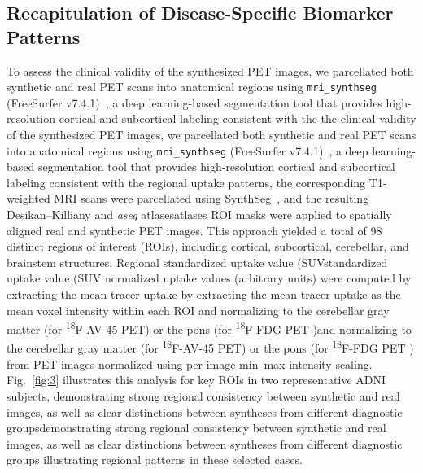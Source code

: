 \documentclass{article}
\providecommand{\DIFaddtex}[1]{{\protect\color{blue} \sf #1}} %
\providecommand{\DIFdeltex}[1]{{\protect\color{red} \ifmmode #1\else\scriptsize #1\fi}} %
\providecommand{\DIFaddbegin}{} %
\providecommand{\DIFaddend}{} %
\providecommand{\DIFdelbegin}{} %
\providecommand{\DIFdelend}{} %
\providecommand{\DIFadd}[1]{\texorpdfstring{\DIFaddtex{#1}}{#1}} %
\providecommand{\DIFdel}[1]{\texorpdfstring{\DIFdeltex{#1}}{}} %
\newcommand{\DIFscaledelfig}{0.5}
\newlength{\DIFdelgraphicswidth} %
\newlength{\DIFdelgraphicsheight} %
\newcommand{\DIFaddincludegraphics}[2][]{{\color{blue}\fbox{\DIFOincludegraphics[#1]{#2}}}} %
\newcommand{\DIFdelincludegraphics}[2][]{%
\sbox{\DIFdelgraphicsbox}{\DIFOincludegraphics[#1]{#2}}%
\settoboxwidth{\DIFdelgraphicswidth}{\DIFdelgraphicsbox} %
\settoboxtotalheight{\DIFdelgraphicsheight}{\DIFdelgraphicsbox} %
\scalebox{\DIFscaledelfig}{%
\parbox[b]{\DIFdelgraphicswidth}{\usebox{\DIFdelgraphicsbox}\\[-\baselineskip] \rule{\DIFdelgraphicswidth}{0em}}\llap{\resizebox{\DIFdelgraphicswidth}{\DIFdelgraphicsheight}{%
\setlength{\unitlength}{\DIFdelgraphicswidth}%
\begin{picture}(1,1)%
\thicklines\linethickness{2pt} %
{\color[rgb]{1,0,0}\put(0,0){\framebox(1,1){}}}%
{\color[rgb]{1,0,0}\put(0,0){\line( 1,1){1}}}%
{\color[rgb]{1,0,0}\put(0,1){\line(1,-1){1}}}%
\end{picture}%
}\hspace*{3pt}}} %
} %
\DeclareRobustCommand{\DIFaddbegin}{\DIFOaddbegin \let\includegraphics\DIFaddincludegraphics} %
\DeclareRobustCommand{\DIFaddend}{\DIFOaddend \let\includegraphics\DIFOincludegraphics} %
\DeclareRobustCommand{\DIFdelbegin}{\DIFOdelbegin \let\includegraphics\DIFdelincludegraphics} %
\DeclareRobustCommand{\DIFdelend}{\DIFOaddend \let\includegraphics\DIFOincludegraphics} %
\begin{document}


\DIFaddend \subsection{Recapitulation of Disease-Specific Biomarker Patterns}
To assess \DIFdelbegin \DIFdel{the clinical validity of the synthesized PET images, we parcellated both synthetic and real PET scans into anatomical regions using \texttt{mri\_synthseg} (FreeSurfer v7.4.1)~\cite{fischl2012freesurfer,dalca2022synthseg}, a deep learning-based segmentation tool that provides high-resolution cortical and subcortical labeling consistent with the }\DIFdelend \DIFaddbegin \DIFadd{regional uptake patterns, the corresponding T1-weighted MRI scans were parcellated using SynthSeg~\cite{synthseg}, and the resulting }\DIFaddend Desikan--Killiany and \textit{aseg} \DIFdelbegin \DIFdel{atlases}\DIFdelend \DIFaddbegin \DIFadd{ROI masks were applied to spatially aligned real and synthetic PET images}\DIFaddend . This approach yielded a total of 98 distinct regions of interest (ROIs), including cortical, subcortical, cerebellar, and brainstem structures. Regional \DIFdelbegin \DIFdel{standardized uptake value  (SUV}\DIFdelend \DIFaddbegin \DIFadd{normalized uptake values (arbitrary units}\DIFaddend ) were computed \DIFdelbegin \DIFdel{by extracting the mean tracer uptake }\DIFdelend \DIFaddbegin \DIFadd{as the mean voxel intensity }\DIFaddend within each ROI \DIFdelbegin \DIFdel{and normalizing to the cerebellar gray matter (for \textsuperscript{18}F-AV-45 PET) or the pons (for \textsuperscript{18}F-FDG PET )}\DIFdelend \DIFaddbegin \DIFadd{from PET images normalized using per-image min--max intensity scaling}\DIFaddend . Fig.~\ref{fig:3} illustrates this analysis for key ROIs in two representative ADNI subjects, \DIFdelbegin \DIFdel{demonstrating strong regional consistency between synthetic and real images, as well as clear distinctions between syntheses from different diagnostic groups}\DIFdelend \DIFaddbegin \DIFadd{illustrating regional patterns in these selected cases}\DIFaddend .
\end{document}
